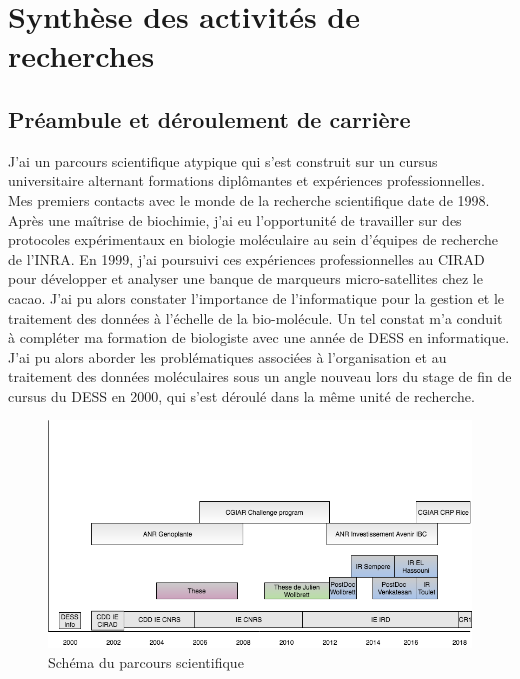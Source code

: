 \chapter{Synthèse des activités de recherches} %

\label{synthese} %

\section{Préambule et déroulement de carrière}
J’ai un parcours scientifique atypique qui s’est construit sur un cursus universitaire alternant formations diplômantes et expériences professionnelles. Mes premiers contacts avec le monde de la recherche scientifique date de 1998. Après une maîtrise de biochimie, j’ai eu l’opportunité de travailler sur des protocoles expérimentaux en biologie moléculaire au sein d’équipes de recherche de l’INRA. En 1999, j’ai poursuivi ces expériences professionnelles au CIRAD pour développer et analyser une banque de marqueurs micro-satellites chez le cacao. J’ai pu alors constater l’importance de l’informatique pour la gestion et le traitement des données à l’échelle de la bio-molécule. Un tel constat m’a conduit à compléter ma formation de biologiste avec une année de DESS en informatique. J’ai pu alors aborder les problématiques associées à l’organisation et au traitement des données moléculaires sous un angle nouveau lors du stage de fin de cursus du DESS en 2000, qui s’est déroulé dans la même unité de recherche. \\

\begin{figure}[!ht]
\begin{center}
	\includegraphics[width=1\textwidth]{Figures/Parcours-overview.png}
\end{center}
\caption{\label{overview} Schéma du parcours scientifique}
\end{figure}

